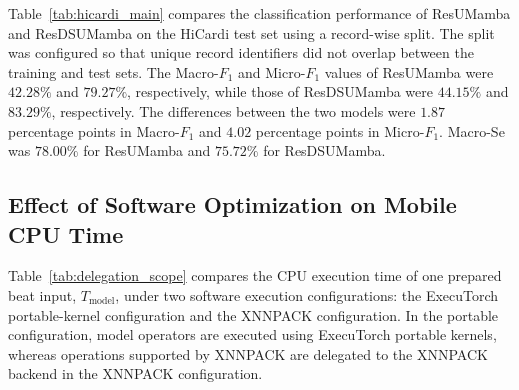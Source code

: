 Table~\ref{tab:hicardi_main} compares the classification performance of ResUMamba and ResDSUMamba on the HiCardi test set using a record-wise split.
The split was configured so that unique record identifiers did not overlap between the training and test sets.
The Macro-$F_1$ and Micro-$F_1$ values of ResUMamba were $42.28\%$ and $79.27\%$, respectively,
while those of ResDSUMamba were $44.15\%$ and $83.29\%$, respectively.
The differences between the two models were $1.87$ percentage points in Macro-$F_1$ and $4.02$ percentage points in Micro-$F_1$.
Macro-Se was $78.00\%$ for ResUMamba and $75.72\%$ for ResDSUMamba.

\subsection{Effect of Software Optimization on Mobile CPU Time}
\label{sec:exp_backend}

\begin{table}[h]
\centering
\caption[Model execution time under Portable and XNNPACK configurations.]{%
$T_{\mathrm{model}}$ (ms) on Samsung SM-G996N (Exynos 2100) under Portable and XNNPACK configurations.}
\label{tab:delegation_scope}
\footnotesize
\setlength{\tabcolsep}{2.2pt}
\end{table}

Table~\ref{tab:delegation_scope} compares the CPU execution time of one prepared
beat input, $T_{\mathrm{model}}$, under two software execution configurations:
the ExecuTorch portable-kernel configuration and the XNNPACK configuration.
In the portable configuration, model operators are executed using ExecuTorch
portable kernels, whereas operations supported by XNNPACK are delegated to the
XNNPACK backend in the XNNPACK configuration.

